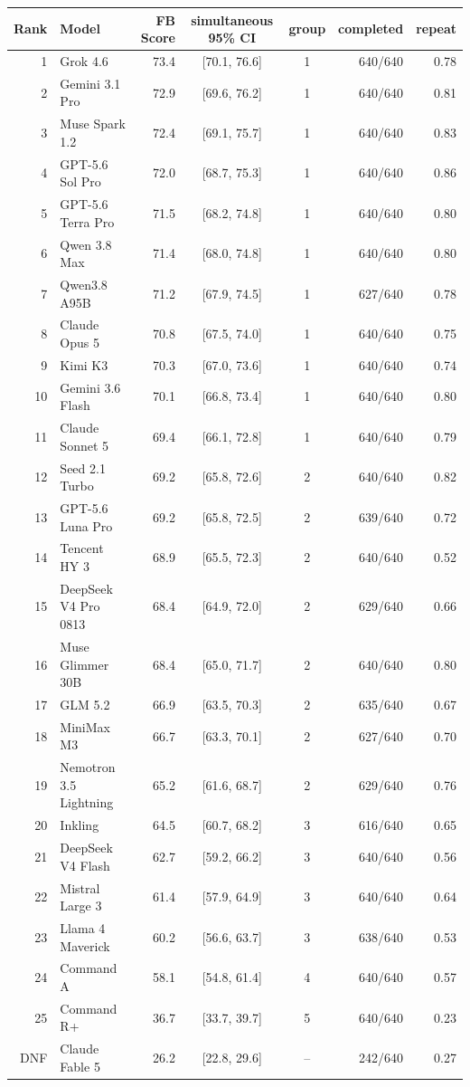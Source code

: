 \begin{tabular}{@{}r l r c c r r@{}}
\toprule
Rank & Model & FB Score & simultaneous 95\% CI & group & completed & repeat \\
\midrule
1 & Grok 4.6 & 73.4 & [70.1, 76.6] & 1 & 640/640 & 0.78 \\
2 & Gemini 3.1 Pro & 72.9 & [69.6, 76.2] & 1 & 640/640 & 0.81 \\
3 & Muse Spark 1.2 & 72.4 & [69.1, 75.7] & 1 & 640/640 & 0.83 \\
4 & GPT-5.6 Sol Pro & 72.0 & [68.7, 75.3] & 1 & 640/640 & 0.86 \\
5 & GPT-5.6 Terra Pro & 71.5 & [68.2, 74.8] & 1 & 640/640 & 0.80 \\
6 & Qwen 3.8 Max & 71.4 & [68.0, 74.8] & 1 & 640/640 & 0.80 \\
7 & Qwen3.8 A95B & 71.2 & [67.9, 74.5] & 1 & 627/640 & 0.78 \\
8 & Claude Opus 5 & 70.8 & [67.5, 74.0] & 1 & 640/640 & 0.75 \\
9 & Kimi K3 & 70.3 & [67.0, 73.6] & 1 & 640/640 & 0.74 \\
10 & Gemini 3.6 Flash & 70.1 & [66.8, 73.4] & 1 & 640/640 & 0.80 \\
11 & Claude Sonnet 5 & 69.4 & [66.1, 72.8] & 1 & 640/640 & 0.79 \\
12 & Seed 2.1 Turbo & 69.2 & [65.8, 72.6] & 2 & 640/640 & 0.82 \\
13 & GPT-5.6 Luna Pro & 69.2 & [65.8, 72.5] & 2 & 639/640 & 0.72 \\
14 & Tencent HY 3 & 68.9 & [65.5, 72.3] & 2 & 640/640 & 0.52 \\
15 & DeepSeek V4 Pro 0813 & 68.4 & [64.9, 72.0] & 2 & 629/640 & 0.66 \\
16 & Muse Glimmer 30B & 68.4 & [65.0, 71.7] & 2 & 640/640 & 0.80 \\
17 & GLM 5.2 & 66.9 & [63.5, 70.3] & 2 & 635/640 & 0.67 \\
18 & MiniMax M3 & 66.7 & [63.3, 70.1] & 2 & 627/640 & 0.70 \\
19 & Nemotron 3.5 Lightning & 65.2 & [61.6, 68.7] & 2 & 629/640 & 0.76 \\
20 & Inkling & 64.5 & [60.7, 68.2] & 3 & 616/640 & 0.65 \\
21 & DeepSeek V4 Flash & 62.7 & [59.2, 66.2] & 3 & 640/640 & 0.56 \\
22 & Mistral Large 3 & 61.4 & [57.9, 64.9] & 3 & 640/640 & 0.64 \\
23 & Llama 4 Maverick & 60.2 & [56.6, 63.7] & 3 & 638/640 & 0.53 \\
24 & Command A & 58.1 & [54.8, 61.4] & 4 & 640/640 & 0.57 \\
25 & Command R+ & 36.7 & [33.7, 39.7] & 5 & 640/640 & 0.23 \\
DNF & Claude Fable 5 & 26.2 & [22.8, 29.6] & -- & 242/640 & 0.27 \\
\bottomrule
\end{tabular}
